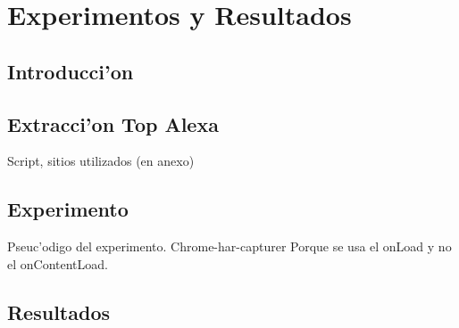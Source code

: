 \chapter{Experimentos y Resultados}

\section{Introducci'on}

\section{Extracci'on Top Alexa}

Script, sitios utilizados (en anexo)

\section{Experimento}

Pseuc'odigo del experimento.
Chrome-har-capturer
Porque se usa el onLoad y no el onContentLoad.

\section{Resultados}